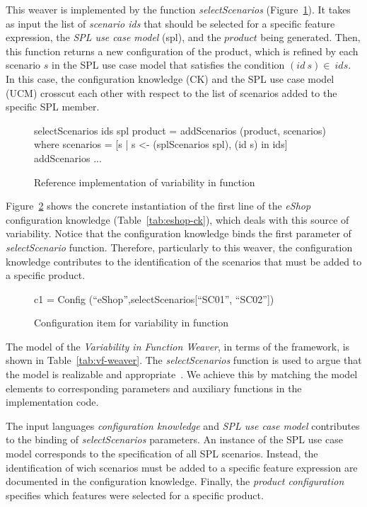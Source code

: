 This weaver is implemented by the function \emph{selectScenarios}
(Figure~\ref{fig:ri-vf}). It takes as input the list of \emph{scenario
ids} that should be selected for a specific feature expression,  the \emph{SPL
use case model} (spl), and the $product$ being generated. Then, this function
returns a new configuration of the product, which is refined by each scenario $s$
in the SPL use case model that satisfies the condition $(id\ s) \in\ ids$. In
this case, the configuration knowledge (CK) and the SPL use case model
(UCM) crosscut each other with respect to the list of scenarios added to the
specific SPL member.

\begin{figure}[ht]
\begin{code}
 selectScenarios ids spl product = 
  addScenarios (product, scenarios)
  where 	
    scenarios = [s | s <- (splScenarios spl), (id s) in ids]
    addScenarios ...
\end{code}
\caption{Reference implementation of variability in function}
\label{fig:ri-vf}
\end{figure}

Figure~\ref{fig:ci-vf} shows the concrete instantiation of the first line of the
\emph{eShop} configuration knowledge (Table~\ref{tab:eshop-ck}), which deals with this
source of variability. Notice that the configuration knowledge
binds the first parameter of \emph{selectScenario} function. Therefore, 
particularly to this weaver, the configuration knowledge contributes to 
the identification of the scenarios that must be added to a specific product.

\begin{figure}[hbt]
\begin{small}
 \begin{code}
c1 = Config (``eShop'',selectScenarios[``SC01'', ``SC02''])
\end{code}
\end{small}
\caption{Configuration item for variability in function}
\label{fig:ci-vf}
\end{figure}

The model of the \emph{Variability in Function Weaver}, in terms of the
framework, is shown in Table~\ref{tab:vf-weaver}. The \emph{selectScenarios}
function is used to argue that the model is realizable and
appropriate~\cite{Masuhara:2003aa}. 
We achieve this by matching the model elements to
corresponding parameters and auxiliary functions in the implementation code. 

The input languages
\emph{configuration knowledge} and \emph{SPL use case model} contributes to the
binding of \emph{selectScenarios} parameters. An instance of the SPL use
case model corresponds to the specification of all SPL scenarios. 
Instead, the identification of wich scenarios must be added to a specific
feature expression are documented in the configuration knowledge. Finally, the
\emph{product configuration} specifies which features were selected for a
specific product.

